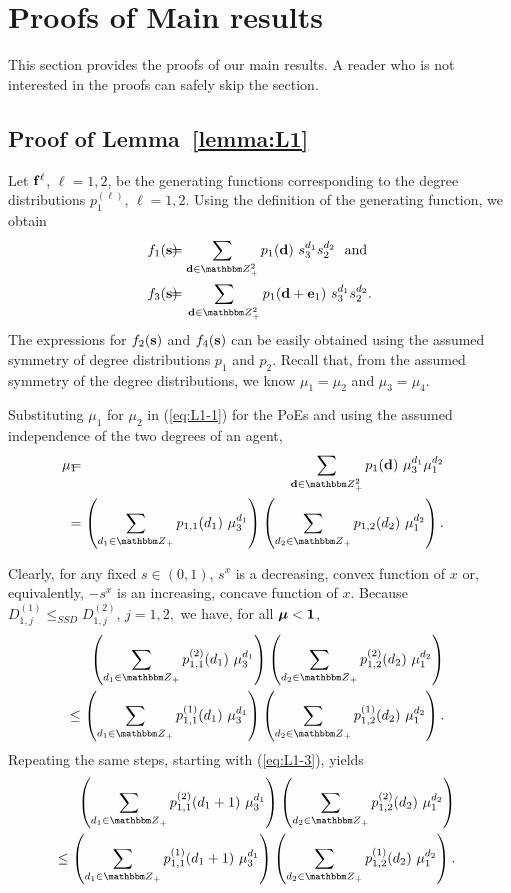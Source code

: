 \documentclass[10pt, journal, compsoc]{IEEEtran}
\newcommand {\bff} {{\bf f}}
\newcommand {\bd} {{\bf d}}
\newcommand {\bs} {{\bf s}}
\newcommand {\bmu} {\boldsymbol{\mu}}
\newcommand {\Z} {{\mathbbm Z}}
\newcommand{\beqa}{\begin{eqnarray}}
\newcommand{\eeqa}{\end{eqnarray}}
\newcommand{\beqan}{\begin{eqnarray*}}
\newcommand{\eeqan}{\end{eqnarray*}}
\newcommand{\myb}{\hspace{-0.1in}}
\newcommand{\myeq}{& \hspace{-0.1in} = & \hspace{-0.1in}}
\newcommand{\lb}{\nonumber \\}
\newcommand{\myleq}{& \myb \leq & \myb}
\newcommand{\myhb}{\hspace{-0.3in}}
\begin{document}
\section{Proofs of Main results}
	\label{sec:Proofs}

This section provides the proofs of our main
results. A reader who is not interested in the
proofs can safely skip the section. 

\subsection{Proof of Lemma~\ref{lemma:L1}}
	\label{appen:L1}

Let $\bff^{\ell}$, $\ell = 1, 2$, be the generating 
functions corresponding to the degree distributions 
$p^{(\ell)}_1$, $\ell = 1, 2$. 
Using the definition of the generating function, 
we obtain
\beqa
f_1(\bs)
\myeq \sum_{\bd \in \Z_+^2} p_1(\bd) \ s_3^{d_1}
	s_2^{d_2} \ \mbox{ and } 
	\label{eq:L1-1} \\
f_3(\bs)
\myeq \sum_{\bd \in \Z_+^2} p_1(\bd+{\bf e}_1) \ s_3^{d_1}
	s_2^{d_2}.
	\label{eq:L1-3} 
\eeqa
The expressions for $f_2(\bs)$ and $f_4(\bs)$ can be 
easily obtained using the assumed symmetry of degree 
distributions $p_1$ and $p_2$. 
Recall that, from the assumed symmetry of the degree 
distributions, we know $\mu_1 = 
\mu_2$ and $\mu_3 = \mu_4$. 


Substituting $\mu_1$ for $\mu_2$ in (\ref{eq:L1-1}) for 
the PoEs and using the assumed independence of the two
degrees of an agent, 
\beqan
\myhb \mu_1 
\myeq \sum_{\bd \in \Z_+^2} p_1(\bd) 
	\ \mu_3^{d_1} \mu_1^{d_2} 
		\label{eq:L1-5} \\
\myeq \left( \sum_{d_1 \in \Z_+} p_{1,1}(d_1) 
		\ \mu_3^{d_1} \right)
	\left( \sum_{d_2 \in \Z_+} p_{1,2}(d_2) 
		\ \mu_1^{d_2} \right). 
	\nonumber
\eeqan

Clearly, for any fixed $s \in (0, 1)$, $s^x$
is a decreasing, convex function of $x$ or, 
equivalently, $-s^x$ is an increasing, concave 
function of $x$. Because $D^{(1)}_{1,j}
\leq_{SSD} D^{(2)}_{1, j}$, $j = 1, 2,$
we have, for all $\bmu < {\bf 1}$,  
\beqan
&& \myhb \left( \sum_{d_1 \in \Z_+} p^{(2)}_{1,1}(d_1) 
		\ \mu_3^{d_1} \right)
	\left( \sum_{d_2 \in \Z_+} p^{(2)}_{1,2}(d_2) 
		\ \mu_1^{d_2} \right) \lb
\myleq \left( \sum_{d_1 \in \Z_+} p^{(1)}_{1,1}(d_1) 
		\ \mu_3^{d_1} \right)
	\left( \sum_{d_2 \in \Z_+} p^{(1)}_{1,2}(d_2) 
		\ \mu_1^{d_2} \right). 
\eeqan
Repeating the same steps, starting with 
(\ref{eq:L1-3}), yields
\beqan
&& \myhb \left( \sum_{d_1 \in \Z_+} p^{(2)}_{1,1}(d_1+1) 
		\ \mu_3^{d_1} \right)
	\left( \sum_{d_2 \in \Z_+} p^{(2)}_{1,2}(d_2) 
		\ \mu_1^{d_2} \right) \lb
\myleq \left( \sum_{d_1 \in \Z_+} p^{(1)}_{1,1}(d_1+1) 
		\ \mu_3^{d_1} \right)
	\left( \sum_{d_2 \in \Z_+} p^{(1)}_{1,2}(d_2) 
		\ \mu_1^{d_2} \right). 
\eeqan
\end{document}

